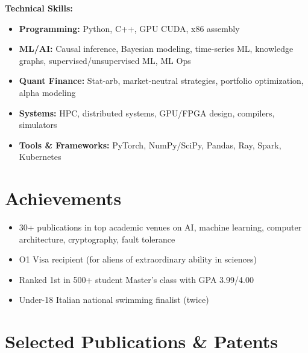 \documentclass[10pt, letterpaper]{article}
\providecommand{\tightlist}{%
\setlength{\itemsep}{0pt}
\setlength{\parskip}{0pt}}
\begin{document}
  \textbf{Technical Skills:}
  \begin{itemize}
    \tightlist

    \item \textbf{Programming:} Python, C++, GPU CUDA, x86 assembly

    \item \textbf{ML/AI:} Causal inference, Bayesian modeling, time-series
      ML, knowledge graphs, supervised/unsupervised ML, ML Ops

    \item \textbf{Quant Finance:} Stat-arb, market-neutral strategies,
      portfolio optimization, alpha modeling

    \item \textbf{Systems:} HPC, distributed systems, GPU/FPGA design, compilers,
      simulators

    \item \textbf{Tools \& Frameworks:} PyTorch, NumPy/SciPy, Pandas, Ray,
      Spark, Kubernetes
  \end{itemize}

  \section{\texorpdfstring{\textbf{Achievements}}{Achievements}}
  \label{achievements}

  \begin{itemize}
    \tightlist

    \item 30+ publications in top academic venues on AI, machine learning,
      computer architecture, cryptography, fault tolerance

    \item O1 Visa recipient (for aliens of extraordinary ability in
      sciences)

    \item Ranked 1st in 500+ student Master's class with GPA 3.99/4.00

    \item Under-18 Italian national swimming finalist (twice)
  \end{itemize}

  \section{\texorpdfstring{\textbf{Selected Publications \& Patents}}{Selected
  Publications \& Patents}}
  \label{selected-publications-patents}
\end{document}
